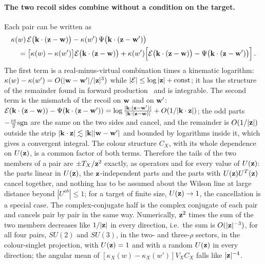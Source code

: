 \paragraph{The two recoil sides combine without a condition on the target.} Each pair can be written as
\begin{align}\label{eq:rmv}
&\kappa(w)\,\mathcal E\big(\mathbf{k}\cdot(\mathbf{z}-\mathbf{w})\big)-\kappa(w')\,\Psi\big(\mathbf{k}\cdot(\mathbf{z}-\mathbf{w}')\big)\notag\\
&\quad=\big[\kappa(w)-\kappa(w')\big]\mathcal E\big(\mathbf{k}\cdot(\mathbf{z}-\mathbf{w})\big)
+\kappa(w')\Big[\mathcal E\big(\mathbf{k}\cdot(\mathbf{z}-\mathbf{w})\big)-\Psi\big(\mathbf{k}\cdot(\mathbf{z}-\mathbf{w}')\big)\Big]\,.
\end{align}
The first term is a real-minus-virtual combination times a kinematic logarithm: $\kappa(w)-\kappa(w')=O(|\mathbf{w}-\mathbf{w}'|/|\mathbf{z}|^3)$ while $|\mathcal E|\le\log|\mathbf{z}|+{\rm const}$; it has the structure of the remainder found in forward production~\cite{Altinoluk:2014eka} and is integrable. The second term is the mismatch of the recoil on $\mathbf{w}$ and on $\mathbf{w}'$: $\mathcal E(\mathbf{k}\cdot(\mathbf{z}-\mathbf{w}))-\Psi(\mathbf{k}\cdot(\mathbf{z}-\mathbf{w}'))=\log\frac{|\mathbf{k}\cdot(\mathbf{z}-\mathbf{w}')|}{|\mathbf{k}\cdot(\mathbf{z}-\mathbf{w})|}+O(1/|\mathbf{k}\cdot\mathbf{z}|)$; the odd parts $-\frac{i\pi}{2}{\rm sgn}$ are the same on the two sides and cancel, and the remainder is $O(1/|\mathbf{z}|)$ outside the strip $|\mathbf{k}\cdot\mathbf{z}|\lesssim|\mathbf{k}||\mathbf{w}-\mathbf{w}'|$ and bounded by logarithms inside it, which gives a convergent integral. The colour structure $C_X$, with its whole dependence on $U(\mathbf{z})$, is a common factor of both terms. Therefore the tails of the two members of a pair are $\pm T_X/\mathbf{z}^2$ exactly, as operators and for every value of $U(\mathbf{z})$: the parts linear in $U(\mathbf{z})$, the $\mathbf{z}$-independent parts and the parts with $U(\mathbf{z})U^T(\mathbf{z})$ cancel together, and nothing has to be assumed about the Wilson line at large distance beyond $|U^{ab}|\le1$; for a target of finite size, $U(\mathbf{z})\to1$, the cancellation is a special case. The complex-conjugate half is the complex conjugate of each pair and cancels pair by pair in the same way. Numerically, $\mathbf{z}^2$ times the sum of the two members decreases like $1/|\mathbf{z}|$ in every direction, i.e.\ the sum is $O(|\mathbf{z}|^{-3})$, for all four pairs, $SU(2)$ and $SU(3)$, in the two- and three-$\rho$ sectors, in the colour-singlet projection, with $U(\mathbf{z})=1$ and with a random $U(\mathbf{z})$ in every direction; the angular mean of $[\kappa_X(w)-\kappa_X(w')]V_XC_X$ falls like $|\mathbf{z}|^{-4}$.

